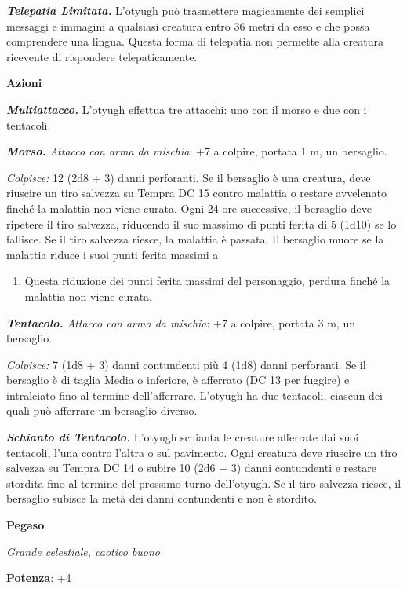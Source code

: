 \begin{multicols}{2}
\emph{\textbf{Telepatia Limitata.}} L'otyugh può trasmettere magicamente
dei semplici messaggi e immagini a qualsiasi creatura entro 36 metri da
esso e che possa comprendere una lingua. Questa forma di telepatia non
permette alla creatura ricevente di rispondere telepaticamente.

\smallskip\textbf{Azioni}

\emph{\textbf{Multiattacco.}} L'otyugh effettua tre attacchi: uno con il
morso e due con i tentacoli.

\emph{\textbf{Morso.} Attacco con arma da mischia}: +7 a colpire,
portata 1 m, un bersaglio.

\emph{Colpisce:} 12 (2d8 + 3) danni perforanti. Se il bersaglio è una
creatura, deve riuscire un tiro salvezza su Tempra DC 15 contro
malattia o restare avvelenato finché la malattia non viene curata. Ogni
24 ore successive, il bersaglio deve ripetere il tiro salvezza,
riducendo il suo massimo di punti ferita di 5 (1d10) se lo fallisce. Se
il tiro salvezza riesce, la malattia è passata. Il bersaglio muore se la
malattia riduce i suoi punti ferita massimi a


\begin{enumerate}
\def\labelenumi{\arabic{enumi}.}
\item
  Questa riduzione dei punti ferita massimi del personaggio, perdura
  finché la malattia non viene curata.
\end{enumerate}


\emph{\textbf{Tentacolo.} Attacco con arma da mischia}: +7 a colpire,
portata 3 m, un bersaglio.

\emph{Colpisce:} 7 (1d8 + 3) danni contundenti più 4 (1d8) danni
perforanti. Se il bersaglio è di taglia Media o inferiore, è afferrato
(DC 13 per fuggire) e intralciato fino al termine dell'afferrare.
L'otyugh ha due tentacoli, ciascun dei quali può afferrare un bersaglio
diverso.

\emph{\textbf{Schianto di Tentacolo.}} L'otyugh schianta le creature
afferrate dai suoi tentacoli, l'una contro l'altra o sul pavimento. Ogni
creatura deve riuscire un tiro salvezza su Tempra DC 14 o subire 10 (2d6
+ 3) danni contundenti e restare stordita fino al termine del prossimo
turno dell'otyugh. Se il tiro salvezza riesce, il bersaglio subisce la
metà dei danni contundenti e non è stordito.




\textbf{Pegaso}

\emph{Grande celestiale, caotico buono}

\textbf{Potenza}: +4


\end{multicols}
